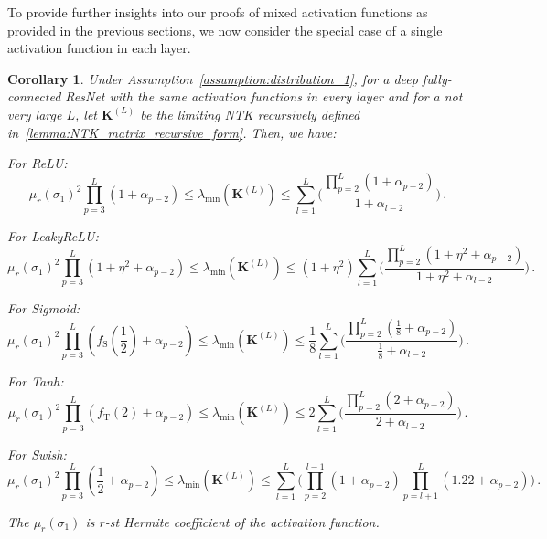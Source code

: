 \documentclass[nohyperref]{article}
\theoremstyle{plain}
\newtheorem{corollary}[theorem]{Corollary}
\theoremstyle{definition}
\theoremstyle{remark}
\begin{document}
To provide further insights into our proofs of mixed activation functions as provided in the previous sections, we now consider the special case of a single activation function in each layer.
\begin{corollary}
\label{thm:lambda_min_inf}
Under Assumption~\ref{assumption:distribution_1}, for a deep fully-connected ResNet with the same activation functions in every layer and for a not very large $L$, let $\bm{K}^{(L)}$ be the limiting NTK recursively defined in~\cref{lemma:NTK_matrix_recursive_form}. Then, we have:

For ReLU:
\begin{equation*}
\mu_{r}(\sigma_1)^{2}\prod_{p=3}^{L}(1+\alpha_{p-2}) \leq\lambda _{\min}(\bm{K}^{(L)})\leq \sum_{l=1}^{L}\bigg(\frac{\prod_{p=2}^{L} (1+\alpha_{p-2})}{1+\alpha_{l-2}}\bigg)\,.
\end{equation*}

For LeakyReLU:
\begin{equation*}
\mu_{r}(\sigma_1)^{2}\prod_{p=3}^{L}(1+\eta^2+\alpha_{p-2}) \leq \lambda _{\min}(\bm{K}^{(L)})\leq (1+\eta^2)\sum_{l=1}^{L} \bigg(\frac{\prod_{p=2}^{L} (1+\eta^2+\alpha_{p-2})}{1+\eta^2+\alpha_{l-2}}\bigg)\,.
\end{equation*}

For Sigmoid:
\begin{equation}
\mu_{r}(\sigma_1)^{2}\prod_{p=3}^{L}(f_{\mathrm{S}}(\frac{1}{2})+\alpha_{p-2}) \leq \lambda _{\min}(\bm{K}^{(L)})\leq\frac{1}{8} \sum_{l=1}^{L}\bigg(\frac{\prod_{p=2}^{L} (\frac{1}{8}+\alpha_{p-2})}{\frac{1}{8}+\alpha_{l-2}}\bigg)\,.
\label{eq:lambda_min_inf_Sigmoid}
\end{equation}

For Tanh:
\begin{equation}
\mu_{r}(\sigma_1)^{2}\prod_{p=3}^{L}(f_{\mathrm{T}}(2)+\alpha_{p-2}) \leq \lambda _{\min}(\bm{K}^{(L)})\leq 2\sum_{l=1}^{L}\bigg(\frac{\prod_{p=2}^{L}(2+\alpha_{p-2})}{2+\alpha_{l-2}}\bigg)\,.
\label{eq:lambda_min_inf_Tanh}
\end{equation}

For Swish:
\begin{equation*}
\mu_{r}(\sigma_1)^{2}\prod_{p=3}^{L}(\frac{1}{2}+\alpha_{p-2}) \leq \lambda _{\min}(\bm{K}^{(L)})\leq \sum_{l=1}^{L}\bigg(\prod_{p=2}^{l-1} (1+\alpha_{p-2})\prod_{p=l+1}^{L}(1.22+\alpha_{p-2})\bigg)\,.
\end{equation*}

The $\mu_r(\sigma_1)$ is $r$-st Hermite coefficient of the activation function. 

\end{corollary}
\end{document}

